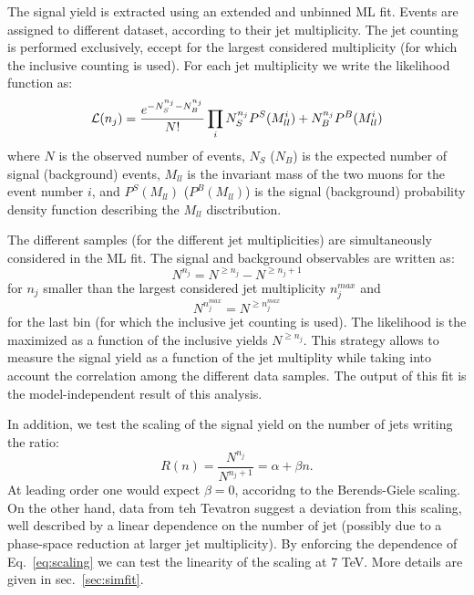 \documentclass{cmspaper}
\begin{document}
The signal yield is extracted using an extended and unbinned ML
fit. Events are assigned to different dataset, according to their jet
multiplicity. The jet counting is performed exclusively, eccept for
the largest considered multiplicity (for which the inclusive counting
is used). For each jet multiplicity we write the likelihood function 
as:
\begin{equation}
{\cal L}(n_j) = \frac{e^{-N^{n_j}_S-N^{n_j}_B}}{N!}\prod_i{N^{n_j}_S P^S(M^i_{ll}) + N^{n_j}_B P^B(M^i_{ll})}
\end{equation}
where $N$ is the observed number of events, $N_S$ ($N_B$) is the expected
number of signal (background) events, $M_{ll}$ is the invariant mass
of the two muons for the event number $i$, and $P^S(M_{ll})$ ($P^B(M_{ll})$)
is the signal (background) probability density function describing the
$M_{ll}$ disctribution. 

The different samples (for the different jet multiplicities) are
simultaneously considered in the ML fit. The signal and background
observables are written as:
\begin{equation}
N^{n_j} = N^{\geq n_j}- N^{\geq n_j+1}
\end{equation}
for $n_j$ smaller than the largest considered jet multiplicity $n^{max}_j$
and
\begin{equation}
N^{n^{max}_j} = N^{\geq n^{max}_j}
\end{equation}
for the last bin (for which the inclusive jet counting is used).  The
likelihood is the maximized as a function of the inclusive yields
$N^{\geq n_j}$. This strategy allows to measure the signal yield as a
function of the jet multiplity while taking into account the
correlation among the different data samples. The output of this fit is the
model-independent result of this analysis.

In addition, we test the scaling of the signal yield on the number of jets
writing the ratio:
\begin{equation}
R(n) = \frac{N^{n_j}}{N^{n_j+1}} = \alpha + \beta n .
\label{eq:scaling}
\end{equation}
At leading order one would expect $\beta=0$, accoridng to the
Berends-Giele scaling.  On the other hand, data from teh Tevatron
suggest a deviation from this scaling, well described by a linear
dependence on the number of jet (possibly due to a phase-space
reduction at larger jet multiplicity). By enforcing the dependence of
Eq.~\ref{eq:scaling} we can test the linearity of the scaling at 7
TeV. More details are given in sec.~\ref{sec:simfit}.
\end{document}
